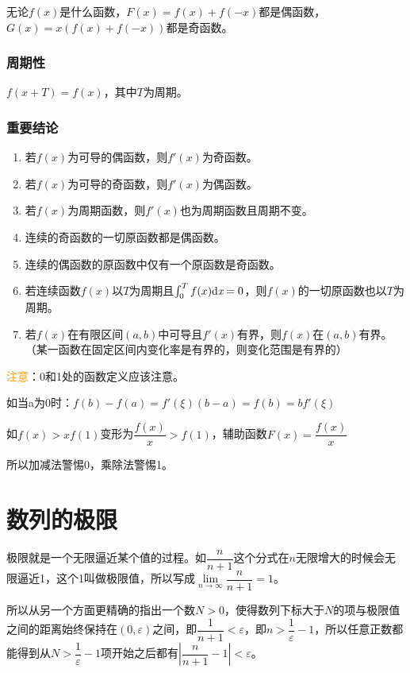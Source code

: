 \documentclass[UTF8, 12pt]{ctexart}
\begin{document}
无论$f(x)$是什么函数，$F(x)=f(x)+f(-x)$都是偶函数，$G(x)=x(f(x)+f(-x))$都是奇函数。

\subsubsection{周期性}

$f(x+T)=f(x)$，其中$T$为周期。 \medskip

\subsubsection{重要结论}

\begin{enumerate}
    \item 若$f(x)$为可导的偶函数，则$f'(x)$为奇函数。
    \item 若$f(x)$为可导的奇函数，则$f'(x)$为偶函数。
    \item 若$f(x)$为周期函数，则$f'(x)$也为周期函数且周期不变。
    \item 连续的奇函数的一切原函数都是偶函数。
    \item 连续的偶函数的原函数中仅有一个原函数是奇函数。
    \item 若连续函数$f(x)$以$T$为周期且$\int_{0}^{T}f(x)\rm{d}\textit{x}=0$，则$f(x)$的一切原函数也以$T$为周期。
    \item 若$f(x)$在有限区间$(a,b)$中可导且$f'(x)$有界，则$f(x)$在$(a,b)$有界。（某一函数在固定区间内变化率是有界的，则变化范围是有界的）
\end{enumerate}

\textcolor{orange}{注意}：0和1处的函数定义应该注意。

如当a为0时：$f(b)-f(a)=f'(\xi )(b-a)=f(b)=bf'(\xi)$

如$f(x)>xf(1)$变形为$\dfrac{f(x)}{x}>f(1)$，辅助函数$F(x)=\dfrac{f(x)}{x}$

所以加减法警惕0，乘除法警惕1。

\section{数列的极限}

极限就是一个无限逼近某个值的过程。如$\dfrac{n}{n+1}$这个分式在$n$无限增大的时候会无限逼近1，这个1叫做极限值，所以写成$\lim\limits_{n\to\infty}\dfrac{n}{n+1}=1$。

所以从另一个方面更精确的指出一个数$N>0$，使得数列下标大于$N$的项与极限值之间的距离始终保持在$(0,\varepsilon)$之间，即$\dfrac{1}{n+1}<\varepsilon$，即$n>\dfrac{1}{\varepsilon}-1$，所以任意正数都能得到从$N>\dfrac{1}{\varepsilon}-1$项开始之后都有$\left\vert\dfrac{n}{n+1}-1\right\vert<\varepsilon$。
\end{document}
